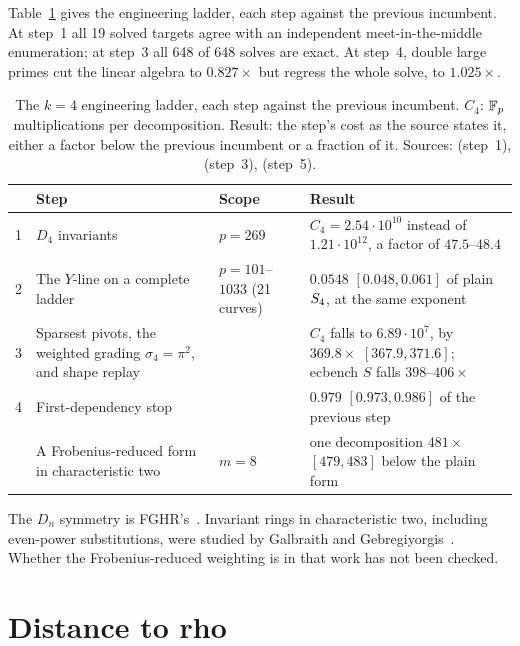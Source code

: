 Table~\ref{tab:extension-ladder} gives the engineering ladder, each step
against the previous incumbent. At step~1 all 19 solved targets agree with
an independent meet-in-the-middle enumeration; at step~3 all 648 of 648
solves are exact. At step~4, double large primes cut the linear algebra to
$0.827\times$ but regress the whole solve, to $1.025\times$.

\begin{table}[t]
\centering\small
\begin{tabularx}{\linewidth}{@{}l>{\raggedright}X>{\raggedright}p{3.0cm}>{\raggedright\arraybackslash}p{5.2cm}@{}}
\toprule
& Step & Scope & Result \\
\midrule
1 & $D_4$ invariants & $p=269$ & $C_4=2.54\cdot10^{10}$ instead of
  $1.21\cdot10^{12}$, a factor of $47.5$--$48.4$ \\
2 & The $Y$-line on a complete ladder & $p=101$--$1033$ (21 curves) &
  $0.0548$ $[0.048,0.061]$ of plain $S_{4}$, at the same exponent \\
3 & Sparsest pivots, the weighted grading $\sigma_4=\pi^2$, and shape
  replay & & $C_4$ falls to $6.89\cdot10^7$, by $369.8\times$
  $[367.9,371.6]$; ecbench $S$ falls $398$--$406\times$ \\
4 & First-dependency stop & & $0.979$ $[0.973,0.986]$ of the previous
  step \\
\addlinespace
5 & A Frobenius-reduced form in characteristic two & $m=8$ & one
  decomposition $481\times$ $[479,483]$ below the plain form \\
\bottomrule
\end{tabularx}
\caption[]{The $k=4$ engineering ladder, each step against the previous
incumbent. $C_4$: $\mathbb{F}_p$ multiplications per decomposition. Result: the
step's cost as the source states it, either a factor below the previous
incumbent or a fraction of it. Sources:
 (step~1),
 (step~3),
 (step~5).}
\label{tab:extension-ladder}
\end{table}
The $D_n$ symmetry is FGHR's~\cite{fghr2014}. Invariant rings in
characteristic two, including even-power substitutions, were studied by
Galbraith and Gebregiyorgis~\cite{galbraith2014}. Whether the
Frobenius-reduced weighting is in that work has not been checked.

\section{Distance to rho}

